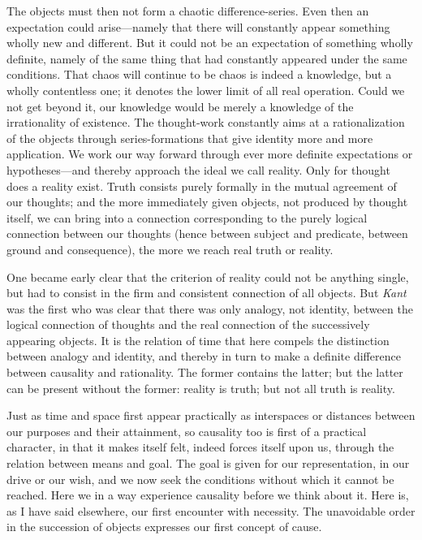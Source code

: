 \documentclass[12pt,a4paper]{book}
\newcommand{\opage}[1]{\marginnote{\footnotesize\textit{[#1]}}}
\begin{document}
The objects must then not form a chaotic difference-series. Even then an
expectation could arise---namely that there will constantly appear something
wholly new and different. But it could not be an expectation of something
wholly definite, \opage{209}namely of the same thing that had constantly appeared under
the same conditions. That chaos will continue to be chaos is indeed a
knowledge, but a wholly contentless one; it denotes the lower limit of all
real operation. Could we not get beyond it, our knowledge would be merely a
knowledge of the irrationality of existence. The thought-work constantly aims
at a rationalization of the objects through series-formations that give
identity more and more application. We work our way forward through ever more
definite expectations or hypotheses---and thereby approach the ideal we call
reality. Only for thought does a reality exist. Truth consists purely
formally in the mutual agreement of our thoughts; and the more immediately
given objects, not produced by thought itself, we can bring into a connection
corresponding to the purely logical connection between our thoughts (hence
between subject and predicate, between ground and consequence), the more we
reach real truth or reality.

One became early clear that the criterion of reality could not be anything
single, but had to consist in the firm and consistent connection of all
objects. But \emph{Kant} was the first who was clear that there was only
analogy, not identity, between the logical connection of thoughts and the
real connection of the successively appearing objects. It is the relation of time that here compels the distinction between analogy and identity, and
thereby in turn to make a definite difference between causality and
rationality. The former contains the latter; but the latter can be present
without the former: reality is truth; but not all truth is reality.

Just as time and space first appear practically as interspaces or distances
between our purposes and their attainment, so causality too is first of a
practical character, in that it makes itself felt, indeed forces itself upon
us, through the relation between means and goal. The goal is given for our
representation, in our drive or our wish, and we now seek the conditions
without which it cannot be reached. Here we in a way experience causality
before we think about it. Here is, as I have said elsewhere, our first
encounter with necessity. The unavoidable order in the \opage{210}succession of objects
expresses our first concept of cause.
\end{document}
